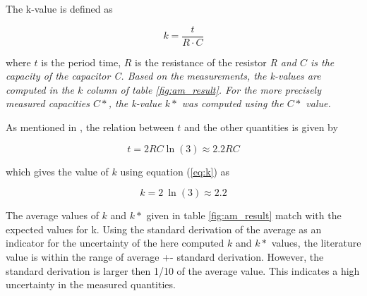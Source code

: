 \documentclass[journal]{IEEEtran}
\begin{document}
The k-value is defined as

\begin{equation}
	k = \frac{t}{R \cdot C}
	\label{eq:k}
\end{equation}

where $t$ is the period time, $R$ is the resistance of the resistor
\em{R} and $C$ is the capacity of the capacitor \em{C}. Based on the
measurements, the k-values are computed in the $k$
column of table \ref{fig:am_result}. For the more precisely measured
capacities $C*$, the k-value $k*$ was computed using the $C*$ value.

As mentioned in \cite{book_dg}, the relation between $t$ and the other
quantities is given by

\begin{equation}
	t = 2RC\ln(3) \approx 2.2RC
\end{equation}

which gives the value of $k$ using equation (\ref{eq:k}) as

\begin{equation}
	k = 2~\ln(3) \approx 2.2
	\label{eq:k_lit}
\end{equation}

The average values of $k$ and $k*$ given in table \ref{fig:am_result} match with the expected values for k. Using the standard derivation of the
average as an indicator for the uncertainty of the here computed $k$ and $k*$
values, the literature value is within the range of average +- standard derivation.
However, the standard derivation is larger then 1/10 of the average value.
 This indicates a high uncertainty in the measured quantities.
\end{document}
